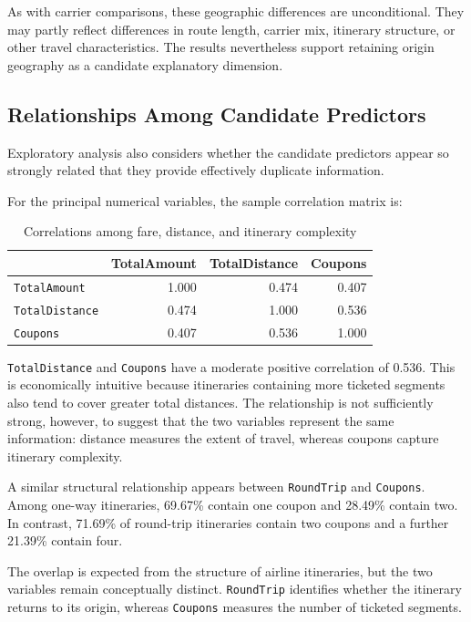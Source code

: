 \documentclass[11pt,a4paper]{article}
\begin{document}
As with carrier comparisons, these geographic differences are unconditional. They may partly reflect differences in route length, carrier mix, itinerary structure, or other travel characteristics. The results nevertheless support retaining origin geography as a candidate explanatory dimension.

\subsection{Relationships Among Candidate Predictors}

Exploratory analysis also considers whether the candidate predictors appear so strongly related that they provide effectively duplicate information.

For the principal numerical variables, the sample correlation matrix is:

\begin{table}[H]
\centering
\caption{Correlations among fare, distance, and itinerary complexity}
\label{tab:eda-correlation}
\begin{tabular}{lrrr}
\toprule
& \textbf{TotalAmount} & \textbf{TotalDistance} & \textbf{Coupons} \\
\midrule
\texttt{TotalAmount} & 1.000 & 0.474 & 0.407 \\
\texttt{TotalDistance} & 0.474 & 1.000 & 0.536 \\
\texttt{Coupons} & 0.407 & 0.536 & 1.000 \\
\bottomrule
\end{tabular}
\end{table}

\texttt{TotalDistance} and \texttt{Coupons} have a moderate positive correlation of 0.536. This is economically intuitive because itineraries containing more ticketed segments also tend to cover greater total distances. The relationship is not sufficiently strong, however, to suggest that the two variables represent the same information: distance measures the extent of travel, whereas coupons capture itinerary complexity.

A similar structural relationship appears between \texttt{RoundTrip} and \texttt{Coupons}. Among one-way itineraries, 69.67\% contain one coupon and 28.49\% contain two. In contrast, 71.69\% of round-trip itineraries contain two coupons and a further 21.39\% contain four.

The overlap is expected from the structure of airline itineraries, but the two variables remain conceptually distinct. \texttt{RoundTrip} identifies whether the itinerary returns to its origin, whereas \texttt{Coupons} measures the number of ticketed segments.
\end{document}
